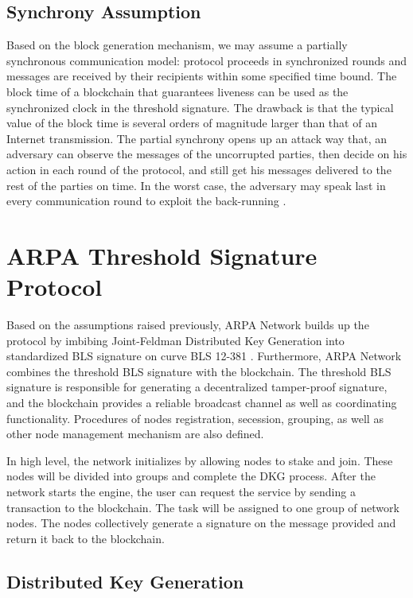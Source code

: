 \documentclass[11pt]{article}
\begin{document}
\subsection{Synchrony Assumption}

Based on the block generation mechanism, we may assume a partially synchronous communication model: protocol proceeds in synchronized rounds and messages are received by their recipients within some specified time bound. The block time of a blockchain that guarantees liveness can be used as the synchronized clock in the threshold signature. The drawback is that the typical value of the block time is several orders of magnitude larger than that of an Internet transmission. The partial synchrony opens up an attack way that, an adversary can observe the messages of the uncorrupted parties, then decide on his action in each round of the protocol, and still get his messages delivered to the rest of the parties on time. In the worst case, the adversary may speak last in every communication round to exploit the back-running \cite{gennaro2007secure}.

\section{ARPA Threshold Signature Protocol}

Based on the assumptions raised previously, ARPA Network builds up the protocol by imbibing Joint-Feldman Distributed Key Generation into standardized BLS signature \cite{irtf-cfrg-bls-signature-05} on curve BLS 12-381 \cite{sean2017bls}. Furthermore, ARPA Network combines the threshold BLS signature with the blockchain. The threshold BLS signature is responsible for generating a decentralized tamper-proof signature, and the blockchain provides a reliable broadcast channel as well as coordinating functionality. Procedures of nodes registration, secession, grouping, as well as other node management mechanism are also defined.

In high level, the network initializes by allowing nodes to stake and join. These nodes will be divided into groups and complete the DKG process. After the network starts the engine, the user can request the service by sending a transaction to the blockchain. The task will be assigned to one group of network nodes. The nodes collectively generate a signature on the message provided and return it back to the blockchain.

\subsection{Distributed Key Generation}
\end{document}
